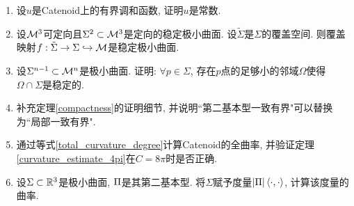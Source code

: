\begin{enumerate}
    \item 设$u$是Catenoid上的有界调和函数, 证明$u$是常数.
    \item 设${\mathcal{M}}^3$可定向且$\Sigma^2 \subset {\mathcal{M}}^3$是定向的稳定极小曲面. 设$\tilde{\Sigma}$是$\Sigma$的覆盖空间. 则覆盖映射$f:\tilde{\Sigma}\to \Sigma \hookrightarrow {\mathcal{M}}$是稳定极小曲面.
    \item 设$\Sigma^{n-1} \subset {\mathcal{M}}^n$是极小曲面. 证明: $\forall p \in \Sigma$, 存在$p$点的足够小的邻域$\Omega$使得$\Omega \cap \Sigma$是稳定的.
    \item 补充定理\eqref{compactness}的证明细节, 并说明``第二基本型一致有界"可以替换为``局部一致有界".
    \item 通过等式\eqref{total_curvature_degree}计算Catenoid的全曲率, 并验证定理\eqref{curvature_estimate_4pi}在$C=8\pi$时是否正确.
    \item 设$\Sigma \subset \mathbb{R}^3$是极小曲面, ${\Pi}$是其第二基本型. 将$\Sigma$赋予度量$\left | {\Pi} \right |{\left < \cdot, \cdot \right >}$, 计算该度量的曲率.
\end{enumerate}